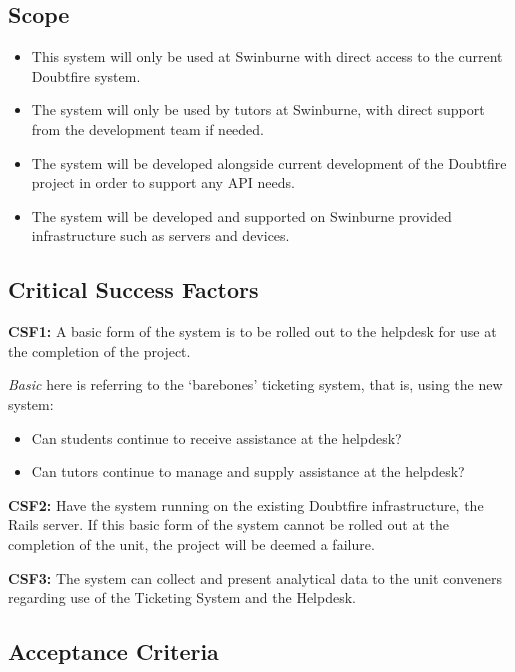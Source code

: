 \documentclass[12pt,a4paper,]{article}
\providecommand{\tightlist}{%
  \setlength{\itemsep}{0pt}\setlength{\parskip}{0pt}}
\begin{document}
\subsection{Scope}\label{scope}

\begin{itemize}
\tightlist
\item
  This system will only be used at Swinburne with direct access to the
  current Doubtfire system.
\item
  The system will only be used by tutors at Swinburne, with direct
  support from the development team if needed.
\item
  The system will be developed alongside current development of the
  Doubtfire project in order to support any API needs.
\item
  The system will be developed and supported on Swinburne provided
  infrastructure such as servers and devices.
\end{itemize}

\subsection{Critical Success Factors}\label{critical-success-factors}

\textbf{CSF1:} A basic form of the system is to be rolled out to the
helpdesk for use at the completion of the project.

\emph{Basic} here is referring to the `barebones' ticketing system, that
is, using the new system:

\begin{itemize}
\tightlist
\item
  Can students continue to receive assistance at the helpdesk?
\item
  Can tutors continue to manage and supply assistance at the helpdesk?
\end{itemize}

\textbf{CSF2:} Have the system running on the existing Doubtfire
infrastructure, the Rails server. If this basic form of the system
cannot be rolled out at the completion of the unit, the project will be
deemed a failure.

\textbf{CSF3:} The system can collect and present analytical data to the
unit conveners regarding use of the Ticketing System and the Helpdesk.

\subsection{Acceptance Criteria}\label{acceptance-criteria}
\end{document}
